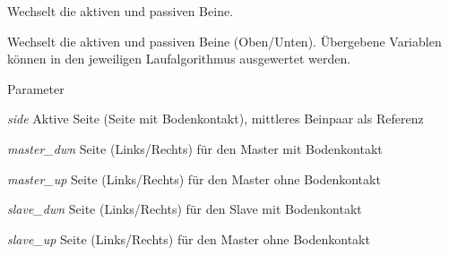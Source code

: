 Wechselt die aktiven und passiven Beine. 

Wechselt die aktiven und passiven Beine (Oben/Unten). Übergebene Variablen können in den jeweiligen Laufalgorithmus ausgewertet werden.


\begin{DoxyParams}{Parameter}
\item[{\em side}]Aktive Seite (Seite mit Bodenkontakt), mittleres Beinpaar als Referenz \item[{\em master\_\-dwn}]Seite (Links/Rechts) für den Master mit Bodenkontakt \item[{\em master\_\-up}]Seite (Links/Rechts) für den Master ohne Bodenkontakt \item[{\em slave\_\-dwn}]Seite (Links/Rechts) für den Slave mit Bodenkontakt \item[{\em slave\_\-up}]Seite (Links/Rechts) für den Master ohne Bodenkontakt \end{DoxyParams}
